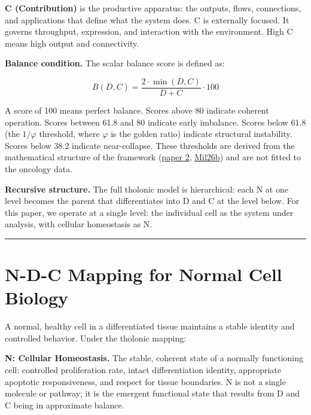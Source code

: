 \documentclass[12pt]{article}
\begin{document}
\textbf{C (Contribution)} is the productive apparatus: the outputs,
flows, connections, and applications that define what the system does. C
is externally focused. It governs throughput, expression, and
interaction with the environment. High C means high output and
connectivity.

\textbf{Balance condition.} The scalar balance score is defined as:

\[B(D,C) = \frac{2 \cdot \min(D,C)}{D + C} \cdot 100\]

A score of 100 means perfect balance. Scores above 80 indicate coherent
operation. Scores between 61.8 and 80 indicate early imbalance. Scores
below 61.8 (the \(1/\varphi\) threshold, where \(\varphi\) is the golden
ratio) indicate structural instability. Scores below 38.2 indicate
near-collapse. These thresholds are derived from the mathematical
structure of the framework
(\href{https://github.com/baardev/truevalue/blob/main/docnav/Research/papers/2_supply-chain-transparency-tvpci/2_supply-chain-transparency-tvpci.pdf}{paper
2},
\href{https://github.com/baardev/truevalue/blob/main/docnav/Research/papers/2_supply-chain-transparency-tvpci/2_supply-chain-transparency-tvpci.pdf}{Mil26b})
and are not fitted to the oncology data.

\textbf{Recursive structure.} The full tholonic model is hierarchical:
each N at one level becomes the parent that differentiates into D and C
at the level below. For this paper, we operate at a single level: the
individual cell as the system under analysis, with cellular homeostasis
as N.

\begin{center}\rule{0.5\linewidth}{0.5pt}\end{center}

\section{N-D-C Mapping for Normal Cell Biology}\label{n-d-c-mapping-for-normal-cell-biology}

A normal, healthy cell in a differentiated tissue maintains a stable
identity and controlled behavior. Under the tholonic mapping:

\textbf{N: Cellular Homeostasis.} The stable, coherent state of a
normally functioning cell: controlled proliferation rate, intact
differentiation identity, appropriate apoptotic responsiveness, and
respect for tissue boundaries. N is not a single molecule or pathway; it
is the emergent functional state that results from D and C being in
approximate balance.
\end{document}
